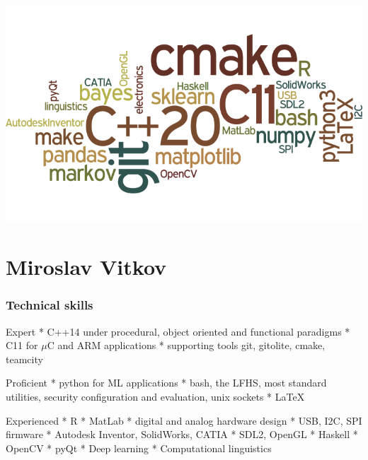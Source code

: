 \documentclass{tccv}
\begin{document}
\includegraphics[width=\textwidth]{wordcloud}


\part{Miroslav Vitkov}


\section{Technical skills}
\begin{factlist}
\item{Expert}
{
     * C++14 under procedural, object oriented and functional paradigms  \mynext
     * C11 for $\mu$C and ARM applications  \mynext
     * supporting tools git, gitolite, cmake, teamcity
}
\\
\item{Proficient}
{
    * python for ML applications \mynext
    * bash, the LFHS, most standard utilities, security configuration and evaluation, unix sockets  \mynext
    * \LaTeX
}
\\
\item{Experienced}
{
    * R                                            \mynext
    * MatLab                                       \mynext
    * digital and analog hardware design           \mynext
    * USB, I2C, SPI firmware                       \mynext
    * Autodesk Inventor, SolidWorks, CATIA         \mynext
    * SDL2, OpenGL                                 \mynext
    * Haskell                                      \mynext
    * OpenCV                                       \mynext
    * pyQt                                         \mynext
    * Deep learning                                \mynext
    * Computational linguistics
}
\end{factlist}
\end{document}
